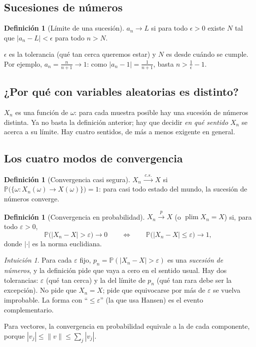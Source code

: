 \documentclass[11pt,a4paper]{article}
\theoremstyle{plain}
\theoremstyle{definition}
\newtheorem{definicion}[teorema]{Definición}
\theoremstyle{remark}
\newtheorem*{intuicion}{Intuición}
\renewcommand{\P}{\mathbb{P}}
\DeclareMathOperator*{\plim}{plim}
\newcommand{\cp}{\xrightarrow{\;p\;}}
\newcommand{\cas}{\xrightarrow{\;c.s.\;}}
\begin{document}
\subsection{Sucesiones de números}

\begin{definicion}[Límite de una sucesión]\label{def:limite}
$a_n\to L$ si para todo $\epsilon>0$ existe $N$ tal que $|a_n-L|<\epsilon$ para todo $n>N$.
\end{definicion}

$\epsilon$ es la tolerancia (qué tan cerca queremos estar) y $N$ es desde cuándo se cumple.
Por ejemplo, $a_n=\frac{n}{n+1}\to1$: como $|a_n-1|=\frac1{n+1}$, basta $n>\frac1\epsilon-1$.

\subsection{¿Por qué con variables aleatorias es distinto?}

$X_n$ es una función de $\omega$: para cada muestra posible hay una sucesión de números
distinta. Ya no basta la definición anterior; hay que decidir \emph{en qué sentido} $X_n$ se
acerca a su límite. Hay cuatro sentidos, de más a menos exigente en general.

\subsection{Los cuatro modos de convergencia}

\begin{definicion}[Convergencia casi segura]\label{def:cs}
$X_n\cas X$ si $\P\big(\{\omega: X_n(\omega)\to X(\omega)\}\big)=1$: para casi todo estado
del mundo, la sucesión de números converge.
\end{definicion}

\begin{definicion}[Convergencia en probabilidad]\label{def:cprob}
$X_n\cp X$ (o $\plim X_n=X$) si, para todo $\varepsilon>0$,
\[
\P\big(|X_n-X|>\varepsilon\big)\to0
\qquad\Longleftrightarrow\qquad
\P\big(|X_n-X|\le\varepsilon\big)\to1 ,
\]
donde $|\cdot|$ es la norma euclidiana.
\end{definicion}

\begin{intuicion}
Para cada $\varepsilon$ fijo, $p_n=\P(|X_n-X|>\varepsilon)$ es una \emph{sucesión de números},
y la definición pide que vaya a cero en el sentido usual. Hay dos tolerancias: $\varepsilon$
(qué tan cerca) y la del límite de $p_n$ (qué tan rara debe ser la excepción). No pide que
$X_n=X$; pide que equivocarse por más de $\varepsilon$ se vuelva improbable. La forma con
``$\le\varepsilon$'' (la que usa Hansen) es el evento complementario.

Para vectores, la convergencia en probabilidad equivale a la de cada componente, porque
$|v_j|\le\|v\|\le\sum_j|v_j|$.
\end{intuicion}
\end{document}
